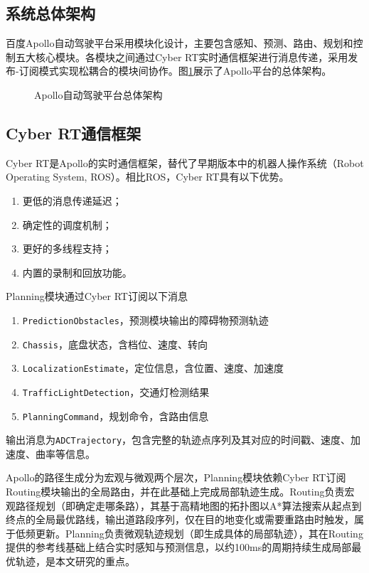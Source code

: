 \subsection{系统总体架构}

百度Apollo自动驾驶平台\cite{apollo2024}采用模块化设计，主要包含感知、预测、路由、规划和控制五大核心模块。各模块之间通过Cyber RT实时通信框架进行消息传递，采用发布-订阅模式实现松耦合的模块间协作。图\ref{fig:apollo_arch}展示了Apollo平台的总体架构。

\begin{figure}[htbp]
\centering
{}
\caption{Apollo自动驾驶平台总体架构}
\label{fig:apollo_arch}
\end{figure}

\subsection{Cyber RT通信框架}

Cyber RT是Apollo的实时通信框架，替代了早期版本中的机器人操作系统（Robot Operating System, ROS）。相比ROS，Cyber RT具有以下优势。
\begin{enumerate}
\item 更低的消息传递延迟；
\item 确定性的调度机制；
\item 更好的多线程支持；
\item 内置的录制和回放功能。
\end{enumerate}

Planning模块通过Cyber RT订阅以下消息
\begin{enumerate}[noitemsep]
\item \texttt{PredictionObstacles}，预测模块输出的障碍物预测轨迹
\item \texttt{Chassis}，底盘状态，含档位、速度、转向
\item \texttt{LocalizationEstimate}，定位信息，含位置、速度、加速度
\item \texttt{TrafficLightDetection}，交通灯检测结果
\item \texttt{PlanningCommand}，规划命令，含路由信息
\end{enumerate}

输出消息为\texttt{ADCTrajectory}，包含完整的轨迹点序列及其对应的时间戳、速度、加速度、曲率等信息。

Apollo的路径生成分为宏观与微观两个层次，Planning模块依赖Cyber RT订阅Routing模块输出的全局路由，并在此基础上完成局部轨迹生成。Routing负责宏观路径规划（即确定走哪条路），其基于高精地图的拓扑图以A*算法搜索从起点到终点的全局最优路线，输出道路段序列，仅在目的地变化或需要重路由时触发，属于低频更新。Planning负责微观轨迹规划（即生成具体的局部轨迹），其在Routing提供的参考线基础上结合实时感知与预测信息，以约100ms的周期持续生成局部最优轨迹，是本文研究的重点。

